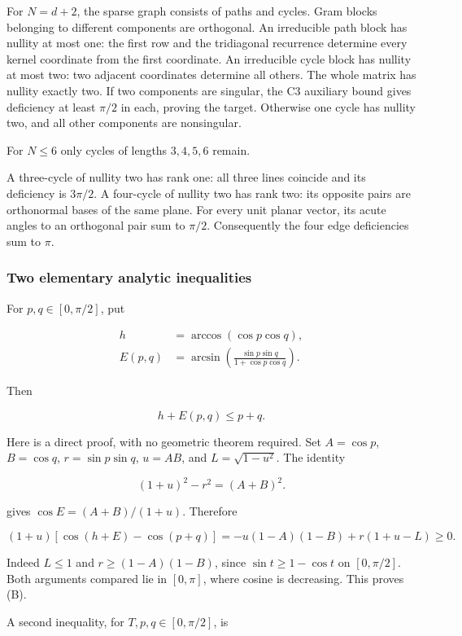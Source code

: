 \documentclass[11pt,a4paper]{article}
\begin{document}
For \(N=d+2\), the sparse graph consists of paths and cycles. Gram blocks belonging to different components are orthogonal. An irreducible path block has nullity at most one: the first row and the tridiagonal recurrence determine every kernel coordinate from the first coordinate. An irreducible cycle block has nullity at most two: two adjacent coordinates determine all others. The whole matrix has nullity exactly two. If two components are singular, the C3 auxiliary bound gives deficiency at least \(\pi/2\) in each, proving the target. Otherwise one cycle has nullity two, and all other components are nonsingular.

For \(N\le6\) only cycles of lengths \(3,4,5,6\) remain.

A three-cycle of nullity two has rank one: all three lines coincide and its deficiency is \(3\pi/2\). A four-cycle of nullity two has rank two: its opposite pairs are orthonormal bases of the same plane. For every unit planar vector, its acute angles to an orthogonal pair sum to \(\pi/2\). Consequently the four edge deficiencies sum to \(\pi\).

\subsubsection{Two elementary analytic inequalities}\label{two-elementary-analytic-inequalities}

For \(p,q\in[0,\pi/2]\), put

\[
\begin{aligned}h&=\arccos(\cos p\cos q),\\E(p,q)&=\arcsin\!\left(\frac{\sin p\sin q}{1+\cos p\cos q}\right).\end{aligned}
\]

Then

\[
h+E(p,q)\le p+q.\tag{B}
\]

Here is a direct proof, with no geometric theorem required. Set \(A=\cos p\), \(B=\cos q\), \(r=\sin p\sin q\), \(u=AB\), and \(L=\sqrt{1-u^2}\). The identity

\[
(1+u)^2-r^2=(A+B)^2.
\]

gives \(\cos E=(A+B)/(1+u)\). Therefore

\[
(1+u)[\cos(h+E)-\cos(p+q)]=-u(1-A)(1-B)+r(1+u-L)\ge0.
\]

Indeed \(L\le1\) and \(r\ge(1-A)(1-B)\), since \(\sin t\ge1-\cos t\) on \([0,\pi/2]\). Both arguments compared lie in \([0,\pi]\), where cosine is decreasing. This proves (B).

A second inequality, for \(T,p,q\in[0,\pi/2]\), is
\end{document}
